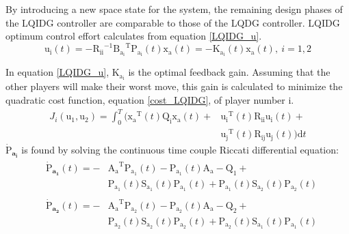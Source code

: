 \documentclass[conference]{IEEEtran}
\begin{document}
By introducing a new space state for the system, the remaining design phases of the LQIDG controller are comparable to those of the LQDG controller. LQIDG optimum control effort calculates from equation \eqref{LQIDG_u}.
\begin{equation}\label{LQIDG_u}
	\boldsymbol{\mathrm{u_i}}(t) = -\boldsymbol{\mathrm{R_{ii}}}^{-1}\boldsymbol{\mathrm{B_{a_i}}}^\mathrm{T}\boldsymbol{\mathrm{P_{a_i}}}(t)\boldsymbol{\mathrm{x_a}}(t) = - \boldsymbol{\mathrm{K_{a_i}}}(t)\boldsymbol{\mathrm{x_a}}(t),~ i = 1, 2
\end{equation}



In equation \eqref{LQIDG_u}, $\boldsymbol{\mathrm{K_{a_i}}}$ is the optimal feedback gain. Assuming that the other players will make their worst move, this gain is calculated to minimize the quadratic cost function, equation \eqref{cost_LQIDG}, of player number i.
\begin{equation}\label{cost_LQIDG}
    \begin{split}
        J_i( \boldsymbol{\mathrm{u_1}},  \boldsymbol{\mathrm{u_2}}) = \int_{0}^{T}\biggl (\boldsymbol{\mathrm{x_a}} ^\mathrm{T}(t) \boldsymbol{\mathrm{Q_i}} \boldsymbol{\mathrm{x_a}}(t)+
        &\boldsymbol{\mathrm{u_i}} ^\mathrm{T}(t) \boldsymbol{\mathrm{R_{ii}}} \boldsymbol{\mathrm{u_i}}(t)+\\
        &\boldsymbol{\mathrm{u_j}} ^\mathrm{T}(t)\boldsymbol{\mathrm{ R_{ij} u_j}}(t)
        \biggl )\mathrm{d}t
    \end{split} 
\end{equation}
$\boldsymbol{\dot{\mathrm{P}}_{a_i}}$ is found by solving the continuous time couple Riccati differential equation:
\begin{equation}\label{coupled_riccatti_LQIDG}
    \begin{split}
        &\begin{split}
            \boldsymbol{\dot{\mathrm{P}}_{a_1}}(t) = -&\boldsymbol{\mathrm{A_a}}^\mathrm{T}\boldsymbol{\mathrm{P_{a_1}}}(t) - \boldsymbol{\mathrm{P_{a_1}}}(t)\boldsymbol{\mathrm{A_a}} - \boldsymbol{\mathrm{Q_1}} +\\ &\boldsymbol{\mathrm{P_{a_1}}}(t)\boldsymbol{\mathrm{S_{a_1}}}(t)\boldsymbol{\mathrm{P_{a_1}}}(t) + \boldsymbol{\mathrm{P_{a_1}}}(t)\boldsymbol{\mathrm{S_{a_2}}}(t)\boldsymbol{\mathrm{P_{a_2}}}(t)
        \end{split}\\
        &\begin{split}
            \boldsymbol{\dot{\mathrm{P}}_{a_2}}(t) = -&\boldsymbol{\mathrm{A_a}}^\mathrm{T}\boldsymbol{\mathrm{P_{a_2}}}(t) - \boldsymbol{\mathrm{P_{a_2}}}(t)\boldsymbol{\mathrm{A_a}} - \boldsymbol{\mathrm{Q_2}} +\\ &\boldsymbol{\mathrm{P_{a_2}}}(t)\boldsymbol{\mathrm{S_{a_2}}}(t)\boldsymbol{\mathrm{P_{a_2}}}(t) + \boldsymbol{\mathrm{P_{a_2}}}(t)\boldsymbol{\mathrm{S_{a_1}}}(t)\boldsymbol{\mathrm{P_{a_1}}}(t)
        \end{split}
    \end{split}
\end{equation}
\end{document}
